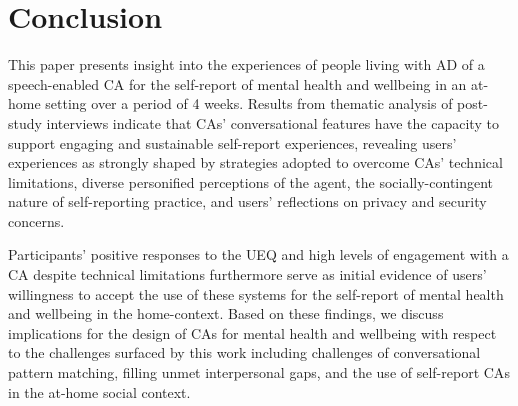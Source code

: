 \section{Conclusion}
   
    This paper presents insight into the experiences of people living with \ac{AD} of a speech-enabled \ac{CA} for the self-report of mental health and wellbeing in an at-home setting over a period of 4 weeks. Results from thematic analysis of post-study interviews indicate that \ac{CA}s' conversational features have the capacity to support engaging and sustainable self-report experiences, revealing users' experiences as strongly shaped by strategies adopted to overcome \ac{CA}s' technical limitations, diverse personified perceptions of the agent, the socially-contingent nature of self-reporting practice, and users' reflections on privacy and security concerns.
    
    Participants' positive responses to the \ac{UEQ} and high levels of engagement with a \ac{CA} despite technical limitations furthermore serve as initial evidence of users' willingness to accept the use of these systems for the self-report of mental health and wellbeing in the home-context. Based on these findings, we discuss implications for the design of \ac{CA}s for mental health and wellbeing with respect to the challenges surfaced by this work including challenges of conversational pattern matching, filling unmet interpersonal gaps, and the use of self-report \ac{CA}s in the at-home social context.

